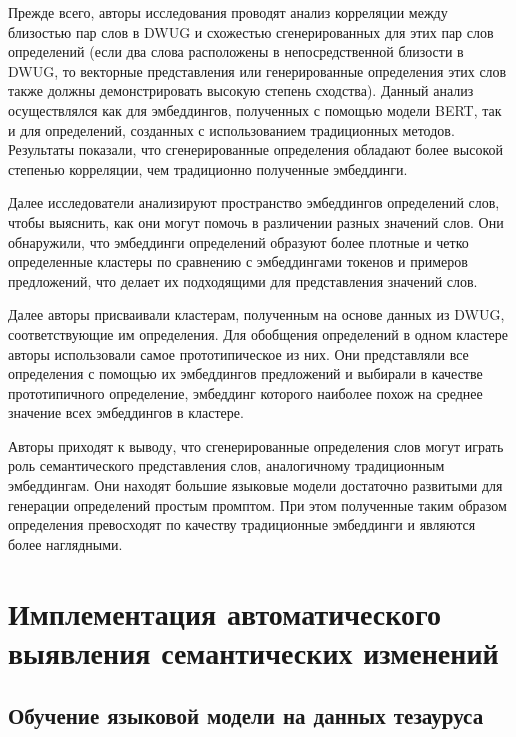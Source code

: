 \documentclass[LI,VKR]{HSEUniversity}
\begin{document}
Прежде всего, авторы исследования проводят анализ корреляции между близостью пар слов в DWUG и
схожестью сгенерированных для этих пар слов определений (если два слова расположены в
непосредственной близости в DWUG, то векторные представления или генерированные определения
этих слов также должны демонстрировать высокую степень сходства).
Данный анализ осуществлялся как для эмбеддингов, полученных с помощью модели BERT,
так и для определений, созданных с использованием традиционных методов.
Результаты показали, что сгенерированные определения обладают более высокой степенью
корреляции, чем традиционно полученные эмбеддинги.

Далее исследователи анализируют пространство эмбеддингов определений слов,
чтобы выяснить, как они могут помочь в различении разных значений слов.
Они обнаружили, что эмбеддинги определений образуют более плотные и четко определенные
кластеры по сравнению с эмбеддингами токенов и примеров предложений, что делает их
подходящими для представления значений слов.

Далее авторы присваивали кластерам, полученным на основе данных из DWUG,
соответствующие им определения.
Для обобщения определений в одном кластере авторы использовали самое прототипическое из них.
Они представляли все определения с помощью их эмбеддингов предложений и выбирали в качестве
прототипичного определение, эмбеддинг которого наиболее похож на среднее значение всех
эмбеддингов в кластере.

Авторы приходят к выводу, что сгенерированные определения слов могут играть роль
семантического представления слов, аналогичному традиционным эмбеддингам.
Они находят большие языковые модели достаточно развитыми для генерации определений
простым промптом.
При этом полученные таким образом определения превосходят по качеству
традиционные эмбеддинги и являются более наглядными.

\chapter{Имплементация автоматического выявления семантических изменений}

\section{Обучение языковой модели на данных тезауруса}
\end{document}
